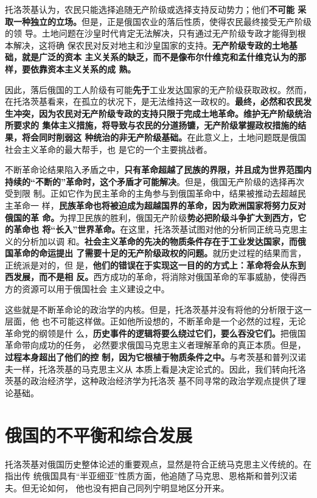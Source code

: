 托洛茨基认为，农民只能选择追随无产阶级或选择支持反动势力；他们\textbf{不可能
采取一种独立的立场。}但是，正是俄国农业的落后性质，使得农民最终接受无产阶级的领
导。土地问题在沙皇时代肯定无法解决，只有通过无产阶级专政才能得到根本解决，这将确
保农民对反对地主和沙皇国家的支持。\textbf{无产阶级专政的土地基础，就是广泛的资本
主义关系的缺乏，而不是像布尔什维克和孟什维克认为的那样，要依靠资本主义关系的成
熟。}

因此，落后俄国的工人阶级有可能\textbf{先于}工业发达国家的无产阶级获取政权。然而，
在托洛茨基看来，在孤立的状况下，是无法维持这一政权的。\textbf{最终，必然和农民发
生冲突，因为农民对无产阶级专政的支持只限于完成土地革命。维护无产阶级统治所要求的
集体主义措施，将导致与农民的分道扬镳，无产阶级掌握政权措施的结果，将会同时削弱这
种统治的非无产阶级基础。}在此意义上，土地问题既是俄国社会主义革命的最大帮手，也
是它的一个主要挑战者。

不断革命论结果陷入矛盾之中，\textbf{只有革命超越了民族的界限，并且成为世界范围内
  持续的“不断的”革命时，这个矛盾才可能解决}。但是，俄国无产阶级的选择再次受到限
制。正如它作为民主革命的主角参与到俄国革命中，结果被推动去超越民主革命一
样，\textbf{民族革命也将被迫成为超越国界的革命，因为欧洲国家将努力反对俄国的革
  命。}为捍卫民族的胜利，俄国无产阶级\textbf{势必把阶级斗争扩大到西方，它的革命也
  将“长入”世界革命。}在这里，托洛茨基试图对他的分析同正统马克思主义的分析加以调
和。\textbf{社会主义革命的先决的物质条件存在于工业发达国家，而俄国革命的命运提出
  了需要十足的无产阶级政权的问题。}就历史过程的结果而言，正统派是对的，但
是，\textbf{他们的错误在于实现这一目的的方式上：革命将会从东到西发展，而不是相
  反。}西方成功的革命，将消除对俄国革命的军事威胁，使得西方的资源可以用于俄国社会
主义建设之中。

这些就是不断革命论的政治学的内核。但是，托洛茨基并没有将他的分析限于这一层面，他
也不可能这样做。正如他所设想的，不断革命是一个必然的过程，无论革命党的纲领是什
么，\textbf{历史事件的逻辑将要么绕过它们，要么吞没它们。}把俄国革命带向成功的任务，
必然要求俄国马克思主义者理解革命的真正本质。但是，\textbf{过程本身超出了他们的控
  制，因为它根植于物质条件之中。}与考茨基和普列汉诺夫一样，托洛茨基的马克思主义从
本质上看是决定论式的。因此，我们转向托洛茨基的政治经济学，这种政治经济学为托洛茨
基不同寻常的政治学观点提供了理论基础。

\section{俄国的不平衡和综合发展}

托洛茨基对俄国历史整体论述的重要观点，显然是符合正统马克思主义传统的。在指出传
统俄国具有“半亚细亚”性质方面，他追随了马克思、恩格斯和普列汉诺夫。但无论如何，
他也没有把自己同列宁明显地区分开来。


